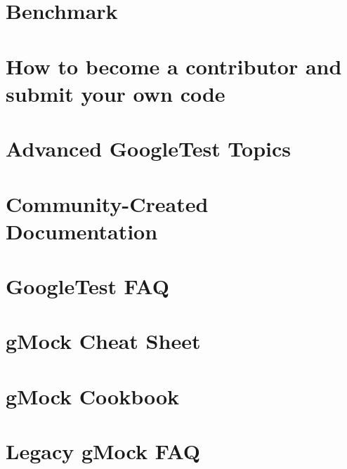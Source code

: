 \let\mypdfximage\pdfximage\def\pdfximage{\immediate\mypdfximage}\documentclass[twoside]{book}
\newcommand{\+}{\discretionary{\mbox{\scriptsize$\hookleftarrow$}}{}{}}
\begin{document}
\chapter{Benchmark}
\label{md_build__deps_googlebenchmark_src_README}

\chapter{How to become a contributor and submit your own code}
\label{md_build__deps_googletest_src_CONTRIBUTING}

\chapter{Advanced Google\+Test Topics}
\label{md_build__deps_googletest_src_docs_advanced}

\chapter{Community-\/\+Created Documentation}
\label{md_build__deps_googletest_src_docs_community_created_documentation}

\chapter{Google\+Test FAQ}
\label{md_build__deps_googletest_src_docs_faq}

\chapter{g\+Mock Cheat Sheet}
\label{md_build__deps_googletest_src_docs_gmock_cheat_sheet}

\chapter{g\+Mock Cookbook}
\label{md_build__deps_googletest_src_docs_gmock_cook_book}

\chapter{Legacy g\+Mock FAQ}
\label{md_build__deps_googletest_src_docs_gmock_faq}

\end{document}
